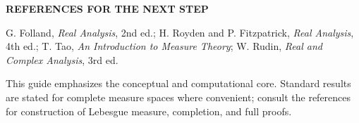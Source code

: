 \documentclass[10pt,a4paper]{article}
\newcommand{\1}{\mathbf 1}
\newcommand{\eyebrow}[1]{{\fontsize{7}{8}\selectfont\bfseries\color{teal}\MakeUppercase{#1}}}
\begin{document}
\begin{quietbox}\eyebrow{References for the next step}\par
G. Folland, \emph{Real Analysis}, 2nd ed.; H. Royden and P. Fitzpatrick, \emph{Real Analysis}, 4th ed.; T. Tao, \emph{An Introduction to Measure Theory}; W. Rudin, \emph{Real and Complex Analysis}, 3rd ed.\end{quietbox}
\vfill
{\fontsize{8}{10}\selectfont\color{muted}This guide emphasizes the conceptual and computational core. Standard results are stated for complete measure spaces where convenient; consult the references for construction of Lebesgue measure, completion, and full proofs.}
\end{document}
